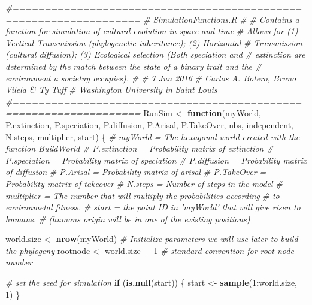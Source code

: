 \documentclass[]{book}
\newenvironment{Shaded}{\begin{snugshade}}{\end{snugshade}}
\newcommand{\KeywordTok}[1]{\textcolor[rgb]{0.13,0.29,0.53}{\textbf{{#1}}}}
\newcommand{\DecValTok}[1]{\textcolor[rgb]{0.00,0.00,0.81}{{#1}}}
\newcommand{\StringTok}[1]{\textcolor[rgb]{0.31,0.60,0.02}{{#1}}}
\newcommand{\CommentTok}[1]{\textcolor[rgb]{0.56,0.35,0.01}{\textit{{#1}}}}
\newcommand{\ControlFlowTok}[1]{\textcolor[rgb]{0.13,0.29,0.53}{\textbf{{#1}}}}
\newcommand{\OperatorTok}[1]{\textcolor[rgb]{0.81,0.36,0.00}{\textbf{{#1}}}}
\newcommand{\NormalTok}[1]{{#1}}
\theoremstyle{definition}
\theoremstyle{definition}
\theoremstyle{remark}
\begin{document}
\begin{Shaded}
\begin{Highlighting}[]
\CommentTok{#==================================================================}
\CommentTok{# SimulationFunctions.R}
\CommentTok{#}
\CommentTok{# Contains a function for simulation of cultural evolution in space and time}
\CommentTok{# Allows for (1) Vertical Transmission (phylogenetic inheritance); (2) Horizontal}
\CommentTok{# Transmission (cultural diffusion); (3) Ecological selection (Both speciation and}
\CommentTok{# extinction are determined by the match between the state of a binary trait and the}
\CommentTok{# environment a societuy occupies).}
\CommentTok{#}
\CommentTok{# 7 Jun 2016}
\CommentTok{# Carlos A. Botero, Bruno Vilela & Ty Tuff}
\CommentTok{# Washington University in Saint Louis}
\CommentTok{#==================================================================}
\NormalTok{RunSim <-}\StringTok{ }\ControlFlowTok{function}\NormalTok{(myWorld, P.extinction, P.speciation,}
\NormalTok{                   P.diffusion, P.Arisal, P.TakeOver, nbs, independent,}
\NormalTok{                   N.steps, multiplier, start) \{}
  \CommentTok{# myWorld = The hexagonal world created with the function BuildWorld}
  \CommentTok{# P.extinction = Probability matrix of extinction}
  \CommentTok{# P.speciation = Probability matrix of speciation}
  \CommentTok{# P.diffusion = Probability matrix of diffusion}
  \CommentTok{# P.Arisal = Probability matrix of arisal}
  \CommentTok{# P.TakeOver = Probability matrix of takeover}
  \CommentTok{# N.steps = Number of steps in the model}
  \CommentTok{# multiplier = The number that will multiply the probabilities according}
  \CommentTok{# to environmetal fitness.}
  \CommentTok{# start = the point ID in 'myWorld' that will give risen to humans.}
  \CommentTok{# (humans origin will be in one of the existing positions)}

\NormalTok{  world.size <-}\StringTok{ }\KeywordTok{nrow}\NormalTok{(myWorld)}
  \CommentTok{# Initialize parameters we will use later to build the phylogeny}
\NormalTok{  rootnode <-}\StringTok{  }\NormalTok{world.size }\OperatorTok{+}\StringTok{ }\DecValTok{1} \CommentTok{# standard convention for root node number}

  \CommentTok{# set the seed for simulation}
  \ControlFlowTok{if}\NormalTok{ (}\KeywordTok{is.null}\NormalTok{(start)) \{}
\NormalTok{  start <-}\StringTok{ }\KeywordTok{sample}\NormalTok{(}\DecValTok{1}\OperatorTok{:}\NormalTok{world.size, }\DecValTok{1}\NormalTok{)}
\NormalTok{  \}}


\end{Highlighting}
\end{Shaded}
\end{document}
